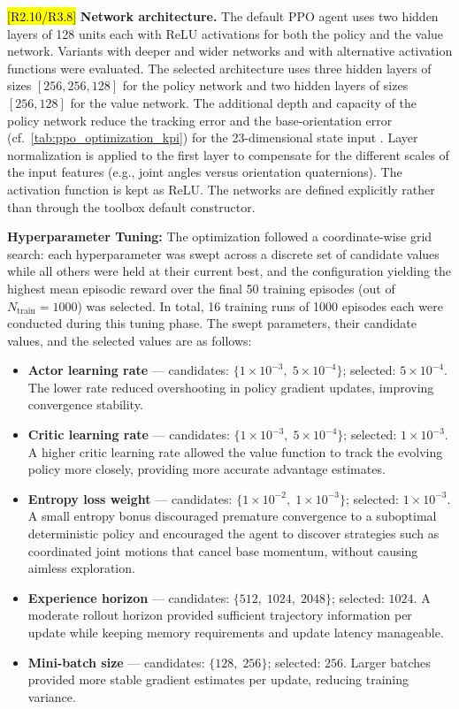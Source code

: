 \documentclass{ieeeaccess}
\newcommand{\hloverlap}[1]{{\sethlcolor{roverlap}\hl{#1}}}
\newenvironment{roverlaphl}
  {\def\FrameCommand{\colorbox{roverlap}}\MakeFramed{\advance\hsize-\width\FrameRestore}}
  {\endMakeFramed}
\begin{document}
\begin{roverlaphl}
\hloverlap{[R2.10/R3.8]} \textbf{Network architecture.} The default PPO agent uses two hidden layers of 128
units each with ReLU activations for both the policy and the value network. Variants with deeper and wider networks and with alternative activation functions were evaluated. The selected architecture uses three hidden layers of sizes $[256, 256, 128]$ for the policy network and two hidden layers of sizes $[256, 128]$ for the value network. The additional depth and capacity of the policy network reduce the tracking error and the base-orientation error (cf.\ \autoref{tab:ppo_optimization_kpi}) for the 23-dimensional state input \cite{b4}. Layer normalization is applied to the first layer to compensate for the different scales of the input features (e.g., joint angles versus orientation quaternions). The activation function is kept as ReLU. The networks are defined explicitly rather than through the toolbox default constructor.

\textbf{Hyperparameter Tuning:} The optimization followed a coordinate-wise grid search: each hyperparameter was swept across a discrete set of candidate values while all others were held at their current best, and the configuration yielding the highest mean episodic reward over the final 50 training episodes (out of $N_{\text{train}}=1000$) was selected. In total, 16 training runs of 1000 episodes each were conducted during this tuning phase. The swept parameters, their candidate values, and the selected values are as follows:
\begin{itemize}
  \item \textbf{Actor learning rate} — candidates: $\{1\!\times\!10^{-3},\;5\!\times\!10^{-4}\}$; selected: $5\!\times\!10^{-4}$. The lower rate reduced overshooting in policy gradient updates, improving convergence stability.
  \item \textbf{Critic learning rate} — candidates: $\{1\!\times\!10^{-3},\;5\!\times\!10^{-4}\}$; selected: $1\!\times\!10^{-3}$. A higher critic learning rate allowed the value function to track the evolving policy more closely, providing more accurate advantage estimates.
  \item \textbf{Entropy loss weight} — candidates: $\{1\!\times\!10^{-2},\;1\!\times\!10^{-3}\}$; selected: $1\!\times\!10^{-3}$. A small entropy bonus discouraged premature convergence to a suboptimal deterministic policy and encouraged the agent to discover strategies such as coordinated joint motions that cancel base momentum, without causing aimless exploration.
  \item \textbf{Experience horizon} — candidates: $\{512,\;1024,\;2048\}$; selected: $1024$. A moderate rollout horizon provided sufficient trajectory information per update while keeping memory requirements and update latency manageable.
  \item \textbf{Mini-batch size} — candidates: $\{128,\;256\}$; selected: $256$. Larger batches provided more stable gradient estimates per update, reducing training variance.
\end{itemize}


\end{roverlaphl}
\end{document}
